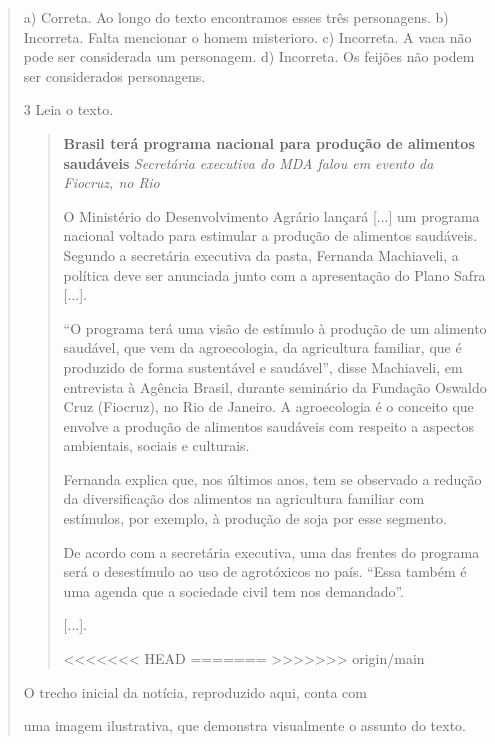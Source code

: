 \begin{quote}
{a) Correta. Ao longo do texto encontramos esses três personagens.
b) Incorreta. Falta mencionar o homem misterioro.
c) Incorreta. A vaca não pode ser considerada um personagem.
d) Incorreta. Os feijões não podem ser considerados personagens.}

\num{3} Leia o texto.

\begin{quote}
\textbf{Brasil terá programa nacional para produção de alimentos saudáveis}
\textit{Secretária executiva do MDA falou em evento da Fiocruz, no Rio}

O Ministério do Desenvolvimento Agrário lançará {[}...{]} um programa nacional voltado para estimular a produção de alimentos saudáveis. Segundo a secretária executiva da pasta, Fernanda Machiaveli, a política deve ser anunciada junto com a apresentação do Plano Safra {[}...{]}.

“O programa terá uma visão de estímulo à produção de um alimento saudável, que vem da agroecologia, da agricultura familiar, que é produzido de forma sustentável e saudável”, disse Machiaveli, em entrevista à Agência Brasil, durante seminário da Fundação Oswaldo Cruz (Fiocruz), no Rio de Janeiro. A agroecologia é o conceito que envolve a produção de alimentos saudáveis com respeito a aspectos ambientais, sociais e culturais.

Fernanda explica que, nos últimos anos, tem se observado a redução da diversificação dos alimentos na agricultura familiar com estímulos, por exemplo, à produção de soja por esse segmento.

De acordo com a secretária executiva, uma das frentes do programa será o desestímulo ao uso de agrotóxicos no país. “Essa também é uma agenda que a sociedade civil tem nos demandado”.

{[}...{]}.

<<<<<<< HEAD
=======
>>>>>>> origin/main
\end{quote}

O trecho inicial da notícia, reproduzido aqui, conta com

\begin{escolha}
\item uma imagem ilustrativa, que demonstra visualmente o assunto do texto.


\end{escolha}
\end{quote}
